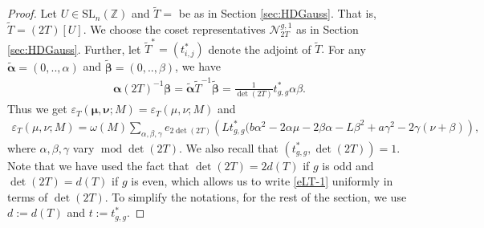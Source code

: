 \documentclass[11pt]{amsart}
\numberwithin{equation}{section}
\newcommand{\mbb}{\mathbb}
\newcommand{\mc}{\mathcal}
\newcommand{\mrm}{\mathrm} %
\renewcommand*{\mod}{\operatorname{mod}}
\newcommand{\slnz}{\mrm{SL}_n(\mbb Z)}
\begin{document}
\begin{proof}
Let $U\in\slnz$ and $\widetilde{T}=$ be as in Section \ref{sec:HDGauss}. That is, $\widetilde{T}=(2T)[U]$. We choose the coset representatives $\mc N_{2T}^{g,1}$ as in Section \ref{sec:HDGauss}. Further, let $\widetilde{T}^*=(t_{i,j}^*)$ denote the adjoint of $\widetilde{T}.$ For any $\tilde{\bm{\alpha}}=(0,..,\alpha)$ and $\tilde{\bm{\beta}}=(0,..,\beta)$, we have 
\begin{align}
    \bm\alpha (2T)^{-1}\bm\beta=\tilde{\bm{\alpha}}\widetilde{T}^{-1}\tilde{\bm{\beta}}= \frac{1}{\det(2T)}t_{g,g}^*\alpha\beta.
\end{align}
Thus we get $\varepsilon_{T}(\bm\mu, \bm\nu;M)= \varepsilon_{T}(\mu, \nu;M)$ and
\begin{align} \label{eLT-1}
\varepsilon_{T}(\mu, \nu;M)= \omega(M)\sum_{\alpha, \beta,\gamma}e_{2\det(2T)}\left(Lt_{g,g}^*(b\alpha^2-2\alpha\mu-2\beta\alpha-L\beta^2+a\gamma^2-2\gamma(\nu+\beta)\right),    
\end{align}
where $\alpha, \beta,\gamma$ vary $\mod \det(2T)$. We also recall that $(t_{g, g}^*, \det(2T))=1$.  Note that we have used the fact that $\det(2T)=2 d(T)$ if $g$ is odd and $\det(2T)= d(T)$ if $g$ is even, which allows us to write \eqref{eLT-1} uniformly in terms of $\det(2T)$. To simplify the notations, for the rest of the section, we use $d:=d(T)$ and $t:=t^*_{g,g}$.


\end{proof}
\end{document}
